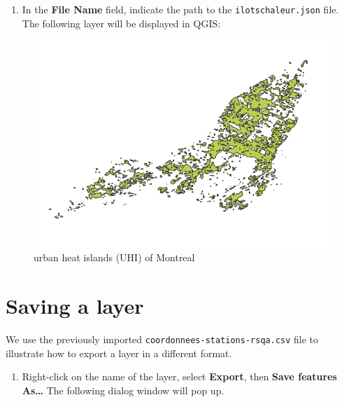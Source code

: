 \documentclass[]{book}
\providecommand{\tightlist}{%
  \setlength{\itemsep}{0pt}\setlength{\parskip}{0pt}}
\theoremstyle{definition}
\theoremstyle{definition}
\theoremstyle{definition}
\theoremstyle{remark}
\begin{document}
\begin{enumerate}
\def\labelenumi{\arabic{enumi}.}
\setcounter{enumi}{1}
\tightlist
\item
  In the \textbf{File Name} field, indicate the path to the
  \texttt{ilotschaleur.json} file. The following layer will be displayed
  in QGIS:
\end{enumerate}

\begin{figure}

{\centering \includegraphics[width=9.46in]{figures/Import_geojson_2} 

}

\caption{urban heat islands (UHI) of Montreal}\label{fig:unnamed-chunk-8}
\end{figure}

\section{Saving a layer}\label{saveLayer}

We use the previously imported \texttt{coordonnees-stations-rsqa.csv}
file to illustrate how to export a layer in a different format.

\begin{enumerate}
\def\labelenumi{\arabic{enumi}.}
\tightlist
\item
  Right-click on the name of the layer, select \textbf{Export}, then
  \textbf{Save features As\ldots{}} The following dialog window will pop
  up.
\end{enumerate}
\end{document}
